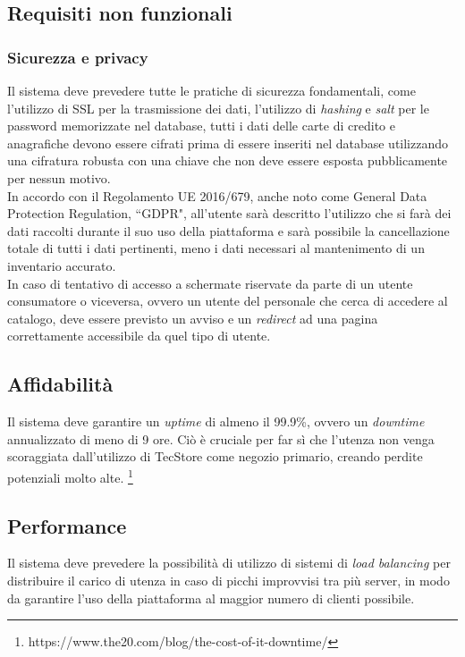 \documentclass[12pt,a4paper]{article}
\begin{document}
\subsection{Requisiti non funzionali}
\subsubsection{Sicurezza e privacy}
Il sistema deve prevedere tutte le pratiche di sicurezza fondamentali, come l'utilizzo di SSL per la trasmissione dei dati, l'utilizzo di \textit{hashing} e \textit{salt} per le password memorizzate nel database, tutti i dati delle carte di credito e anagrafiche devono essere cifrati prima di essere inseriti nel database utilizzando una cifratura robusta con una chiave che non deve essere esposta pubblicamente per nessun motivo. \\
In accordo con il Regolamento UE 2016/679, anche noto come General Data Protection Regulation, ``GDPR", all'utente sarà descritto l'utilizzo che si farà dei dati raccolti durante il suo uso della piattaforma e sarà possibile la cancellazione totale di tutti i dati pertinenti, meno i dati necessari al mantenimento di un inventario accurato. \\
In caso di tentativo di accesso a schermate riservate da parte di un utente consumatore o viceversa, ovvero un utente del personale che cerca di accedere al catalogo, deve essere previsto un avviso e un \textit{redirect} ad una pagina correttamente accessibile da quel tipo di utente.

\subsection{Affidabilità}
Il sistema deve garantire un \emph{uptime} di almeno il 99.9\%, ovvero un \textit{downtime} annualizzato di meno di 9 ore. Ciò è cruciale per far sì che l'utenza non venga scoraggiata dall'utilizzo di TecStore come negozio primario, creando perdite potenziali molto alte. \footnote{https://www.the20.com/blog/the-cost-of-it-downtime/}

\subsection{Performance}
Il sistema deve prevedere la possibilità di utilizzo di sistemi di \textit{load balancing} per distribuire il carico di utenza in caso di picchi improvvisi tra più server, in modo da garantire l'uso della piattaforma al maggior numero di clienti possibile.
\end{document}
